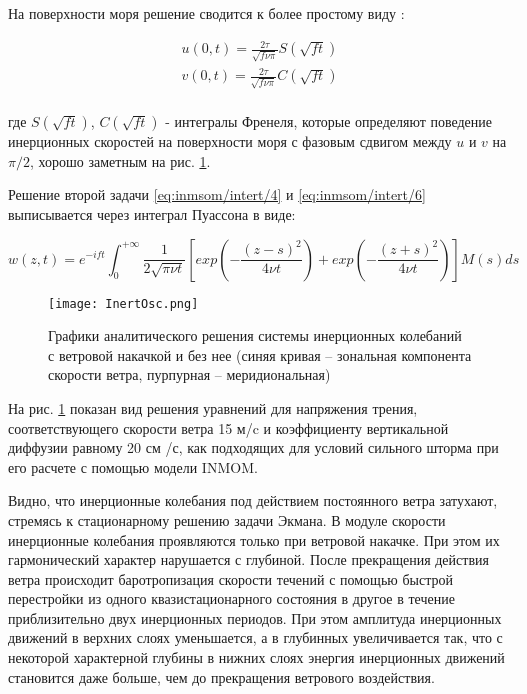 На поверхности моря решение сводится к более простому виду \cite{InertOscKorotaev}:

\begin{equation} \label{eq:inmsom/intert/9}
  \begin{array}{l}
    \displaystyle{ u(0, t) = \frac{2 \tau}{\sqrt{f \nu \pi}} S(\sqrt{ft}) } \\
    \displaystyle{ v(0, t) = \frac{2 \tau}{\sqrt{f \nu \pi}} C(\sqrt{ft}) } \\
  \end{array}
\end{equation}

где $S(\sqrt{ft})$, $C(\sqrt{ft})$ - интегралы Френеля, которые определяют поведение инерционных скоростей на поверхности моря
с фазовым сдвигом между $u$ и $v$ на $\pi/2$, хорошо заметным на рис. \ref{fig:intert_osc_analytic}.

Решение второй задачи \ref{eq:inmsom/intert/4} и \ref{eq:inmsom/intert/6} выписывается через интеграл Пуассона в виде:

\begin{equation} \label{eq:inmsom/intert/10}
w(z,t) = e^{-ift} \int^{+\infty}_0 \frac{1}{2 \sqrt{\pi\nu t} } \left[ exp(-\frac{(z-s)^2}{4\nu t}) + exp(-\frac{(z+s)^2}{4\nu t}) \right] M(s) ds 
\end{equation}

\begin{figure}[htb!]
    \center
    \texttt{[image: InertOsc.png]}
    \caption{Графики аналитического решения системы инерционных колебаний с ветровой накачкой и без нее (синяя кривая – зональная компонента скорости ветра, пурпурная – меридиональная)}
    \label{fig:intert_osc_analytic}
\end{figure}
    
На рис. \ref{fig:intert_osc_analytic} показан вид решения уравнений для напряжения трения, соответствующего скорости ветра 15 м/c и коэффициенту
вертикальной диффузии равному 20 см /с, как подходящих для условий сильного шторма при его расчете с помощью модели INMOM.

Видно, что инерционные колебания под действием постоянного ветра затухают, стремясь к стационарному решению задачи Экмана.
В модуле скорости инерционные колебания проявляются только при ветровой накачке. При этом их гармонический характер нарушается с глубиной.
После прекращения действия ветра происходит баротропизация скорости течений с помощью быстрой перестройки из одного квазистационарного состояния в другое в течение приблизительно двух инерционных периодов.
При этом амплитуда инерционных движений в верхних слоях уменьшается, а в глубинных увеличивается так, что с некоторой характерной глубины в нижних слоях энергия инерционных движений становится даже больше, чем до прекращения ветрового воздействия.

